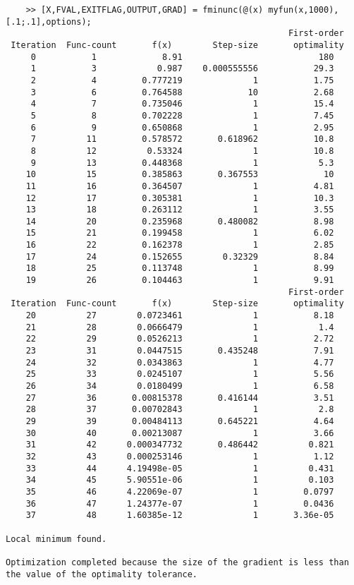 \documentclass{article}
\begin{document}
\begin{verbatim}
    >> [X,FVAL,EXITFLAG,OUTPUT,GRAD] = fminunc(@(x) myfun(x,1000),[.1;.1],options);
                                                        First-order 
 Iteration  Func-count       f(x)        Step-size       optimality
     0           1             8.91                           180
     1           3            0.987    0.000555556           29.3  
     2           4         0.777219              1           1.75  
     3           6         0.764588             10           2.68  
     4           7         0.735046              1           15.4  
     5           8         0.702228              1           7.45  
     6           9         0.650868              1           2.95  
     7          11         0.578572       0.618962           10.8  
     8          12          0.53324              1           10.8  
     9          13         0.448368              1            5.3  
    10          15         0.385863       0.367553             10  
    11          16         0.364507              1           4.81  
    12          17         0.305381              1           10.3  
    13          18         0.263112              1           3.55  
    14          20         0.235968       0.480082           8.98  
    15          21         0.199458              1           6.02  
    16          22         0.162378              1           2.85  
    17          24         0.152655        0.32329           8.84  
    18          25         0.113748              1           8.99  
    19          26         0.104463              1           9.91  
                                                        First-order 
 Iteration  Func-count       f(x)        Step-size       optimality
    20          27        0.0723461              1           8.18  
    21          28        0.0666479              1            1.4  
    22          29        0.0526213              1           2.72  
    23          31        0.0447515       0.435248           7.91  
    24          32        0.0343863              1           4.77  
    25          33        0.0245107              1           5.56  
    26          34        0.0180499              1           6.58  
    27          36       0.00815378       0.416144           3.51  
    28          37       0.00702843              1            2.8  
    29          39       0.00484113       0.645221           4.64  
    30          40       0.00213087              1           3.66  
    31          42      0.000347732       0.486442          0.821  
    32          43      0.000253146              1           1.12  
    33          44      4.19498e-05              1          0.431  
    34          45      5.90551e-06              1          0.103  
    35          46      4.22069e-07              1         0.0797  
    36          47      1.24377e-07              1         0.0436  
    37          48      1.60385e-12              1       3.36e-05  

Local minimum found.

Optimization completed because the size of the gradient is less than
the value of the optimality tolerance.
\end{verbatim}
\end{document}
